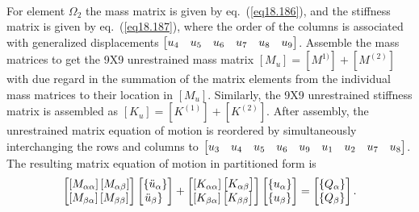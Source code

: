 \documentclass{AeroStructure-ERJohnson}
\begin{document}
\begin{example}
\begin{align}
\end{align}
For element $\Omega_2$ the mass matrix is given by eq.~(\ref{eq18.186}), and the stiffness matrix is given by eq.~(\ref{eq18.187}), where the order of the columns is associated with generalized displacements $\left[\begin{array}{@{}llllll@{}}u_{4} & u_{5} & u_{6} & u_{7} & u_{8} & u_{9}\end{array}\right]$. Assemble the mass matrices to get the 9X9 unrestrained mass matrix $\left[M_{u}\right]=\left[M^{1)}\right]+\left[M^{(2)}\right]$ with due regard in the summation of the matrix elements from the individual mass matrices to their location in $\left[M_{u}\right]$. Similarly, the 9X9 unrestrained stiffness matrix is assembled as $\left[K_{u}\right]=\left[K^{(1)}\right]+\left[K^{(2)}\right]$. After assembly, the unrestrained matrix equation of motion is reordered by simultaneously interchanging the rows and columns to $\left[\begin{array}{@{}lllllllll@{}}u_{3} & u_{4} & u_{5} & u_{6} & u_{9} & u_{1} & u_{2} & u_{7} & u_{8}\end{array}\right]$.\vadjust{\pagebreak} The resulting matrix equation of motion in partitioned form is
\begin{align}\label{ex18.5d}
\left[\begin{array}{@{}l@{}}{\left[M_{\alpha \alpha}\right]\left[M_{\alpha \beta}\right]} \\{\left[M_{\beta \alpha}\right]\left[M_{\beta \beta}\right]}\end{array}\right]\left[\begin{array}{@{}l@{}}\left\{\ddot{u}_{\alpha}\right\} \\\left.\ddot{u}_{\beta}\right\}\end{array}\right]+\left[\begin{array}{@{}l@{}}{\left[K_{\alpha \alpha}\right]\left[\begin{array}{@{}l@{}}K_{\alpha \beta}\end{array}\right]} \\{\left[K_{\beta \alpha}\right]\left[\begin{array}{@{}l@{}}K_{\beta \beta}\end{array}\right]}\end{array}\right]\left[\begin{array}{@{}l@{}}\left\{u_{\alpha}\right\} \\\left\{u_{\beta}\right\}\end{array}\right]=\left[\begin{array}{@{}l@{}}\left\{Q_{\alpha}\right\} \\\left\{Q_{\beta}\right\}\end{array}\right].

\end{align}
\end{example}
\end{document}
